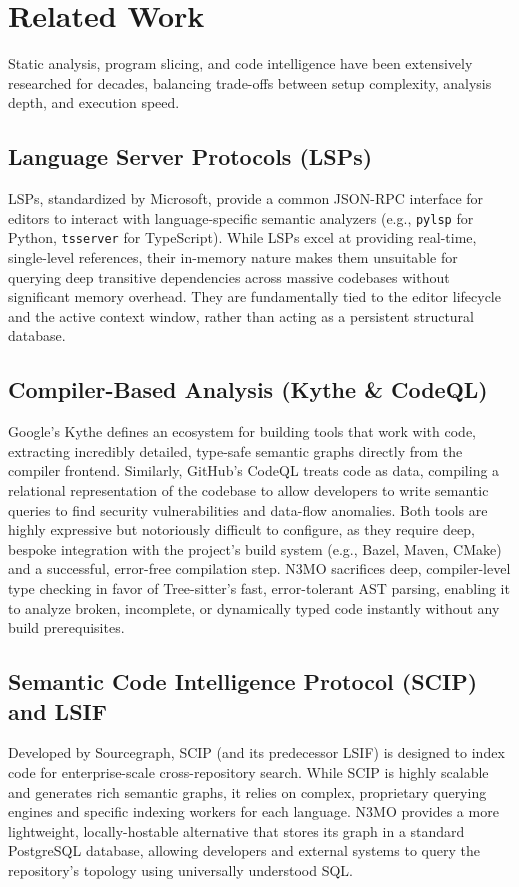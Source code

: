 \documentclass[conference]{IEEEtran}
\begin{document}
\section{Related Work}

Static analysis, program slicing, and code intelligence have been extensively researched for decades, balancing trade-offs between setup complexity, analysis depth, and execution speed.

\subsection{Language Server Protocols (LSPs)}
LSPs, standardized by Microsoft, provide a common JSON-RPC interface for editors to interact with language-specific semantic analyzers (e.g., \texttt{pylsp} for Python, \texttt{tsserver} for TypeScript). While LSPs excel at providing real-time, single-level references, their in-memory nature makes them unsuitable for querying deep transitive dependencies across massive codebases without significant memory overhead. They are fundamentally tied to the editor lifecycle and the active context window, rather than acting as a persistent structural database.

\subsection{Compiler-Based Analysis (Kythe \& CodeQL)}
Google's Kythe defines an ecosystem for building tools that work with code, extracting incredibly detailed, type-safe semantic graphs directly from the compiler frontend. Similarly, GitHub's CodeQL treats code as data, compiling a relational representation of the codebase to allow developers to write semantic queries to find security vulnerabilities and data-flow anomalies. Both tools are highly expressive but notoriously difficult to configure, as they require deep, bespoke integration with the project's build system (e.g., Bazel, Maven, CMake) and a successful, error-free compilation step. N3MO sacrifices deep, compiler-level type checking in favor of Tree-sitter's fast, error-tolerant AST parsing, enabling it to analyze broken, incomplete, or dynamically typed code instantly without any build prerequisites.

\subsection{Semantic Code Intelligence Protocol (SCIP) and LSIF}
Developed by Sourcegraph, SCIP (and its predecessor LSIF) is designed to index code for enterprise-scale cross-repository search. While SCIP is highly scalable and generates rich semantic graphs, it relies on complex, proprietary querying engines and specific indexing workers for each language. N3MO provides a more lightweight, locally-hostable alternative that stores its graph in a standard PostgreSQL database, allowing developers and external systems to query the repository's topology using universally understood SQL.
\end{document}
